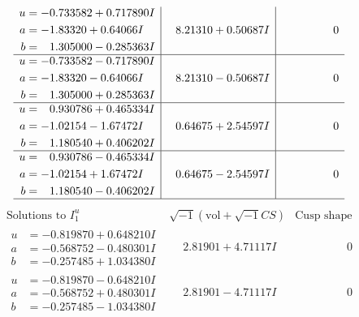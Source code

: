 \documentclass[1p]{elsarticle_modified}
\theoremstyle{definition}
\newcommand{\I}{\sqrt{-1}}
\begin{document}
$$\begin{array}{c|c|c}
\begin{aligned}
u &= -0.733582 + 0.717890 I \\
a &= -1.83320 + 0.64066 I \\
b &= \phantom{-}1.305000 - 0.285363 I\end{aligned}
 & \phantom{-}8.21310 + 0.50687 I & \phantom{-0.000000 } 0 \\ \hline\begin{aligned}
u &= -0.733582 - 0.717890 I \\
a &= -1.83320 - 0.64066 I \\
b &= \phantom{-}1.305000 + 0.285363 I\end{aligned}
 & \phantom{-}8.21310 - 0.50687 I & \phantom{-0.000000 } 0 \\ \hline\begin{aligned}
u &= \phantom{-}0.930786 + 0.465334 I \\
a &= -1.02154 - 1.67472 I \\
b &= \phantom{-}1.180540 + 0.406202 I\end{aligned}
 & \phantom{-}0.64675 + 2.54597 I & \phantom{-0.000000 } 0 \\ \hline\begin{aligned}
u &= \phantom{-}0.930786 - 0.465334 I \\
a &= -1.02154 + 1.67472 I \\
b &= \phantom{-}1.180540 - 0.406202 I\end{aligned}
 & \phantom{-}0.64675 - 2.54597 I & \phantom{-0.000000 } 0\\
 \hline 
 \end{array}$$\newpage$$\begin{array}{c|c|c}  
\text{Solutions to }I^u_{1}& \I (\text{vol} + \sqrt{-1}CS) & \text{Cusp shape}\\
 \hline 
\begin{aligned}
u &= -0.819870 + 0.648210 I \\
a &= -0.568752 - 0.480301 I \\
b &= -0.257485 + 1.034380 I\end{aligned}
 & \phantom{-}2.81901 + 4.71117 I & \phantom{-0.000000 } 0 \\ \hline\begin{aligned}
u &= -0.819870 - 0.648210 I \\
a &= -0.568752 + 0.480301 I \\
b &= -0.257485 - 1.034380 I\end{aligned}
 & \phantom{-}2.81901 - 4.71117 I & \phantom{-0.000000 } 0 \\ \hline\begin{aligned}

\end{aligned}
\end{array}$$
\end{document}
